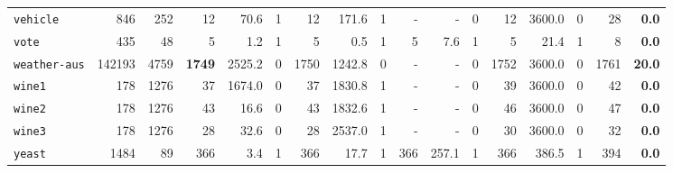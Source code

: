 \begin{tabular}{lccrrrrrrrrrrrrrr}
\texttt{vehicle} & \multicolumn{1}{r}{846} & \multicolumn{1}{r}{252}  & 12 & 70.6 & 1 & 12 & 171.6 & 1 & - & - & 0 & 12 & 3600.0 & 0 & 28 & \textbf{0.0}\\
\texttt{vote} & \multicolumn{1}{r}{435} & \multicolumn{1}{r}{48}  & 5 & 1.2 & 1 & 5 & 0.5 & 1 & 5 & 7.6 & 1 & 5 & 21.4 & 1 & 8 & \textbf{0.0}\\
\texttt{weather-aus} & \multicolumn{1}{r}{142193} & \multicolumn{1}{r}{4759}  & \textbf{1749} & 2525.2 & 0 & 1750 & 1242.8 & 0 & - & - & 0 & 1752 & 3600.0 & 0 & 1761 & \textbf{20.0}\\
\texttt{wine1} & \multicolumn{1}{r}{178} & \multicolumn{1}{r}{1276}  & 37 & 1674.0 & 0 & 37 & 1830.8 & 1 & - & - & 0 & 39 & 3600.0 & 0 & 42 & \textbf{0.0}\\
\texttt{wine2} & \multicolumn{1}{r}{178} & \multicolumn{1}{r}{1276}  & 43 & 16.6 & 0 & 43 & 1832.6 & 1 & - & - & 0 & 46 & 3600.0 & 0 & 47 & \textbf{0.0}\\
\texttt{wine3} & \multicolumn{1}{r}{178} & \multicolumn{1}{r}{1276}  & 28 & 32.6 & 0 & 28 & 2537.0 & 1 & - & - & 0 & 30 & 3600.0 & 0 & 32 & \textbf{0.0}\\
\texttt{yeast} & \multicolumn{1}{r}{1484} & \multicolumn{1}{r}{89}  & 366 & 3.4 & 1 & 366 & 17.7 & 1 & 366 & 257.1 & 1 & 366 & 386.5 & 1 & 394 & \textbf{0.0}\\
\bottomrule
\end{tabular}

